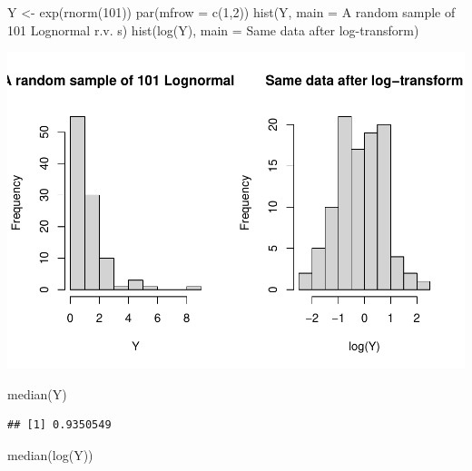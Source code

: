 \documentclass[
]{book}
\newenvironment{Shaded}{\begin{snugshade}}{\end{snugshade}}
\newcommand{\AttributeTok}[1]{\textcolor[rgb]{0.77,0.63,0.00}{#1}}
\newcommand{\DecValTok}[1]{\textcolor[rgb]{0.00,0.00,0.81}{#1}}
\newcommand{\FunctionTok}[1]{\textcolor[rgb]{0.00,0.00,0.00}{#1}}
\newcommand{\NormalTok}[1]{#1}
\newcommand{\OtherTok}[1]{\textcolor[rgb]{0.56,0.35,0.01}{#1}}
\newcommand{\StringTok}[1]{\textcolor[rgb]{0.31,0.60,0.02}{#1}}
\begin{document}
\begin{Shaded}
\begin{Highlighting}[]
\NormalTok{Y }\OtherTok{\textless{}{-}} \FunctionTok{exp}\NormalTok{(}\FunctionTok{rnorm}\NormalTok{(}\DecValTok{101}\NormalTok{))}
\FunctionTok{par}\NormalTok{(}\AttributeTok{mfrow =} \FunctionTok{c}\NormalTok{(}\DecValTok{1}\NormalTok{,}\DecValTok{2}\NormalTok{))}
\FunctionTok{hist}\NormalTok{(Y, }\AttributeTok{main =} \StringTok{\textquotesingle{}A random sample of 101 Lognormal r.v. s\textquotesingle{}}\NormalTok{)}
\FunctionTok{hist}\NormalTok{(}\FunctionTok{log}\NormalTok{(Y), }\AttributeTok{main =} \StringTok{\textquotesingle{}Same data after log{-}transform\textquotesingle{}}\NormalTok{)}
\end{Highlighting}
\end{Shaded}

\includegraphics{04-Non-Normal-Responses_files/figure-latex/unnamed-chunk-1-1.pdf}

\begin{Shaded}
\begin{Highlighting}[]
\FunctionTok{median}\NormalTok{(Y)}
\end{Highlighting}
\end{Shaded}

\begin{verbatim}
## [1] 0.9350549
\end{verbatim}

\begin{Shaded}
\begin{Highlighting}[]
\FunctionTok{median}\NormalTok{(}\FunctionTok{log}\NormalTok{(Y))}
\end{Highlighting}
\end{Shaded}
\end{document}
